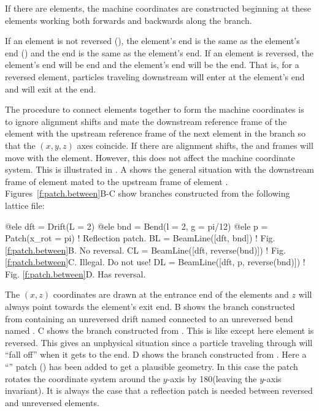 If there are  elements, the machine coordinates are constructed beginning at these
elements working both forwards and backwards along the branch.

If an element is not reversed (),
the element's  end is the same as the element's  end 
() and the
 end is the same as the element's  end. If an element is reversed, 
the element's  end will be  end and the element's
 end will be the  end. That is, for a reversed element, particles 
traveling downstream will
enter at the element's  end and will exit at the  end.

The procedure to connect elements together to form the machine coordinates is to ignore 
alignment shifts and mate the
downstream reference frame of the element with the upstream reference frame of the next element in
the branch so that the $(x,y,z)$ axes coincide.
If there are alignment shifts, the  and  frames will move with the element. 
However, this does not affect the machine
coordinate system.
This is illustrated in . A shows the general situation
with the downstream frame of element  mated to the upstream frame of element .
Figures~\ref{f:patch.between}B-C show branches constructed from the following lattice file:
\begin{example}
  @ele dft = Drift(L = 2)
  @ele bnd = Bend(l = 2, g = pi/12)
  @ele p = Patch(x_rot = pi)             ! Reflection patch.
  BL = BeamLine([dft, bnd])              ! Fig. \ref{f:patch.between}B. No reversal.
  CL = BeamLine([dft, reverse(bnd)])     ! Fig. \ref{f:patch.between}C. Illegal. Do not use!
  DL = BeamLine([dft, p, reverse(bnd)])  ! Fig. \ref{f:patch.between}D. Has reversal.
\end{example}
The $(x,z)$ coordinates are drawn at the entrance end of the elements and $z$ will always point
towards the element's exit end.  B shows the branch constructed from
 containing an unreversed drift named  connected to an unreversed bend named
. C shows the branch constructed from . This is like
 except here element  is reversed. This gives an unphysical situation since a
particle traveling through  will ``fall off'' when it gets to the end.
D shows the branch constructed from . Here a ``''
patch  () has been added to get a plausible geometry. 
In this case the patch rotates the
coordinate system around the $y$-axis by 180\Deg (leaving the $y$-axis invariant). 
It is always the case that a reflection patch is needed between reversed and unreversed elements.

